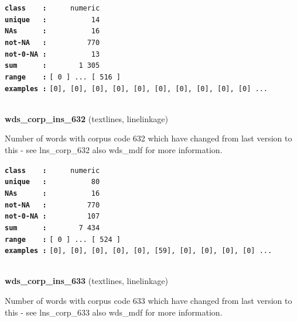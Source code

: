 \documentclass[]{article}
\begin{document}
\textbf{\texttt{class\ \ \ \ :}} \texttt{~~~~~numeric}\\
\textbf{\texttt{unique\ \ \ :}} \texttt{~~~~~~~~~~14}\\
\textbf{\texttt{NAs\ \ \ \ \ \ :}} \texttt{~~~~~~~~~~16}\\
\textbf{\texttt{not-NA\ \ \ :}} \texttt{~~~~~~~~~770}\\
\textbf{\texttt{not-0-NA\ :}} \texttt{~~~~~~~~~~13}\\
\textbf{\texttt{sum\ \ \ \ \ \ :}} \texttt{~~~~~~~1~305}\\
\textbf{\texttt{range\ \ \ \ :}}
\texttt{{[}\ 0\ {]}\ ...\ {[}\ 516\ {]}}\\
\textbf{\texttt{examples\ :}}
\texttt{{[}0{]},\ {[}0{]},\ {[}0{]},\ {[}0{]},\ {[}0{]},\ {[}0{]},\ {[}0{]},\ {[}0{]},\ {[}0{]},\ {[}0{]}\ ...}\\

~

\textbf{wds\_corp\_ins\_632} (textlines, linelinkage)

Number of words with corpus code 632 which have changed from last
version to this - see lns\_corp\_632 also wds\_mdf for more information.

\textbf{\texttt{class\ \ \ \ :}} \texttt{~~~~~numeric}\\
\textbf{\texttt{unique\ \ \ :}} \texttt{~~~~~~~~~~80}\\
\textbf{\texttt{NAs\ \ \ \ \ \ :}} \texttt{~~~~~~~~~~16}\\
\textbf{\texttt{not-NA\ \ \ :}} \texttt{~~~~~~~~~770}\\
\textbf{\texttt{not-0-NA\ :}} \texttt{~~~~~~~~~107}\\
\textbf{\texttt{sum\ \ \ \ \ \ :}} \texttt{~~~~~~~7~434}\\
\textbf{\texttt{range\ \ \ \ :}}
\texttt{{[}\ 0\ {]}\ ...\ {[}\ 524\ {]}}\\
\textbf{\texttt{examples\ :}}
\texttt{{[}0{]},\ {[}0{]},\ {[}0{]},\ {[}0{]},\ {[}0{]},\ {[}59{]},\ {[}0{]},\ {[}0{]},\ {[}0{]},\ {[}0{]}\ ...}\\

~

\textbf{wds\_corp\_ins\_633} (textlines, linelinkage)

Number of words with corpus code 633 which have changed from last
version to this - see lns\_corp\_633 also wds\_mdf for more information.
\end{document}
